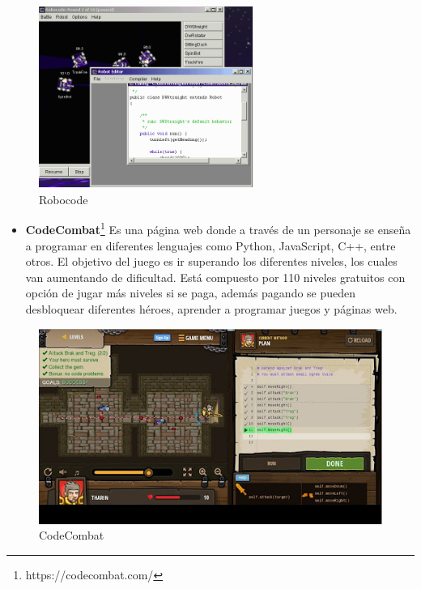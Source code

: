 \begin{figure}[H]
    \centering
    \includegraphics[width=7cm, keepaspectratio]{img/Robocode.png}
    \caption{Robocode}
    \label{fig:robocode}
\end{figure}

\begin{itemize}
\item \textbf{CodeCombat}\footnote{ https://codecombat.com/} Es una página web donde a través de un personaje se enseña a programar en diferentes lenguajes como Python, JavaScript, C++, entre otros. El objetivo del juego es ir superando los diferentes niveles, los cuales van aumentando de dificultad. Está compuesto por 110 niveles gratuitos con opción de jugar más niveles si se paga, además pagando se pueden desbloquear diferentes héroes, aprender a programar juegos y páginas web\cite{app}.
\end{itemize}

\begin{figure}[H]
    \centering
    \includegraphics[width=13cm, keepaspectratio]{img/Codecombat.jpg}
    \caption{CodeCombat}
    \label{fig:codecombat}
\end{figure}


